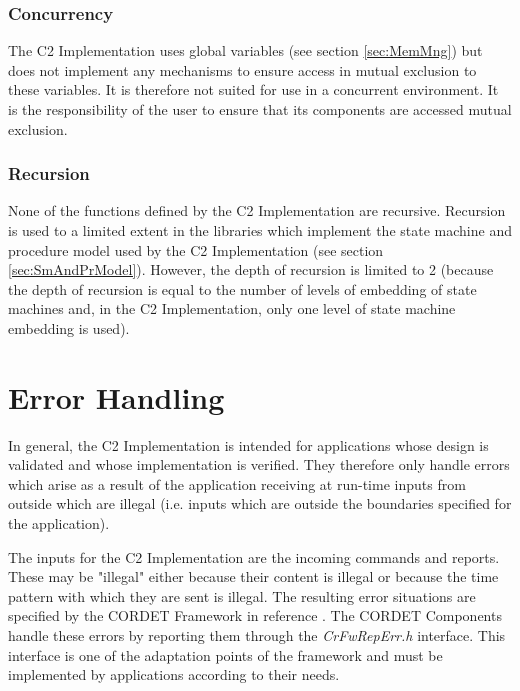 \documentclass[a4paper,10pt]{article}
\let\stdsection\section
\renewcommand\section{\newpage\stdsection}
\begin{document}
\subsubsection{Concurrency}
The C2 Implementation uses global variables (see section \ref{sec:MemMng}) but does not implement any mechanisms to ensure access in mutual exclusion to these variables. It is therefore not suited for use in a concurrent environment. It is the responsibility of the user to ensure that its components are accessed mutual exclusion.

\subsubsection{Recursion}
None of the functions defined by the C2 Implementation are recursive. Recursion is used to a limited extent in the libraries which implement the state machine and procedure model used by the C2 Implementation (see section \ref{sec:SmAndPrModel}). However, the depth of recursion is limited to 2 (because the depth of recursion is equal to the number of levels of embedding of state machines and, in the C2 Implementation, only one level of state machine embedding is used).  


\section{Error Handling}\label{sec:ErrHandling}

In general, the C2 Implementation is intended for applications whose design is validated and whose implementation is verified. They therefore only handle errors which arise as a result of the application receiving at run-time inputs from outside which are illegal (i.e. inputs which are outside the boundaries specified for the application). 

The inputs for the C2 Implementation are the incoming commands and reports. These may be "illegal" either because their content is illegal or because the time pattern with which they are sent is illegal. The resulting error situations are specified by the CORDET Framework in reference \cite{ref:cordetfw}. The CORDET Components handle these errors by reporting them through the \textit{CrFwRepErr.h} interface. This interface is one of the adaptation points of the framework and must be implemented by applications according to their needs. 
\end{document}
